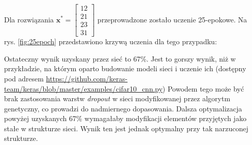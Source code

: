 Dla rozwiązania $\mathbf{x^*} = \begin{bmatrix}12 \\ 21 \\ 23 \\ 31\end{bmatrix}$ przeprowadzone zostało uczenie 25-epokowe.
Na rys. \ref{fig:25epoch} przedstawiono krzywą uczenia dla tego przypadku:

Ostateczny wynik uzyskany przez sieć to 67\%.
Jest to gorszy wynik, niż w przykładzie, na którym oparto budowanie modeli sieci i uczenie ich (dostępny pod adresem \url{https://github.com/keras-team/keras/blob/master/examples/cifar10_cnn.py})
Powodem tego może być brak zastosowania warstw \textit{dropout} w sieci modyfikowanej przez algorytm genetyczny, co prowadzi do nadmiernego dopasowania.
Dalsza optymalizacja powyżej uzyskanych 67\% wymagałaby modyfikacji elementów przyjętych jako stałe w strukturze sieci.
Wynik ten jest jednak optymalny przy tak narzuconej strukturze.

